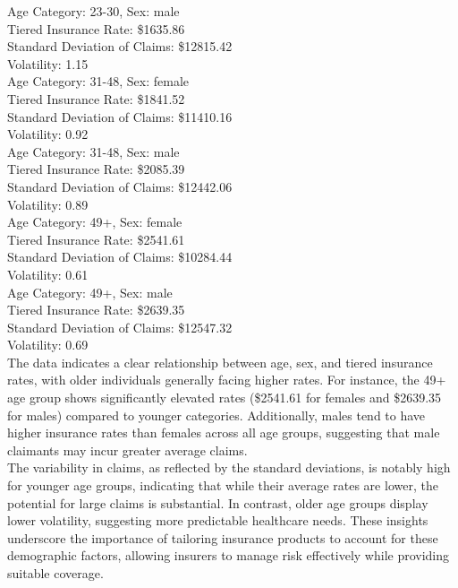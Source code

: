 \documentclass[12pt]{exam}
\begin{document}
\begin{questions}
Age Category: 23-30, Sex: male\\
Tiered Insurance Rate: \$1635.86\\
Standard Deviation of Claims: \$12815.42\\
Volatility: 1.15\\

Age Category: 31-48, Sex: female\\
Tiered Insurance Rate: \$1841.52\\
Standard Deviation of Claims: \$11410.16\\
Volatility: 0.92\\

Age Category: 31-48, Sex: male\\
Tiered Insurance Rate: \$2085.39\\
Standard Deviation of Claims: \$12442.06\\
Volatility: 0.89\\

Age Category: 49+, Sex: female\\
Tiered Insurance Rate: \$2541.61\\
Standard Deviation of Claims: \$10284.44\\
Volatility: 0.61\\

Age Category: 49+, Sex: male\\
Tiered Insurance Rate: \$2639.35\\
Standard Deviation of Claims: \$12547.32\\
Volatility: 0.69\\

The data indicates a clear relationship between age, sex, and tiered insurance rates, with older individuals generally facing higher rates. For instance, the 49+ age group shows significantly elevated rates (\$2541.61 for females and \$2639.35 for males) compared to younger categories. Additionally, males tend to have higher insurance rates than females across all age groups, suggesting that male claimants may incur greater average claims.\\

The variability in claims, as reflected by the standard deviations, is notably high for younger age groups, indicating that while their average rates are lower, the potential for large claims is substantial. In contrast, older age groups display lower volatility, suggesting more predictable healthcare needs. These insights underscore the importance of tailoring insurance products to account for these demographic factors, allowing insurers to manage risk effectively while providing suitable coverage.\\


\end{questions}
\end{document}
